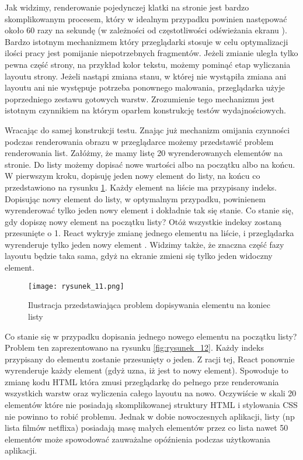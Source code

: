Jak widzimy, renderowanie pojedynczej klatki na stronie jest bardzo skomplikowanym procesem, który w idealnym przypadku powinien następować około 60 razy na sekundę (w zależności od  częstotliwości odświeżania ekranu ).
Bardzo istotnym mechanizmem który przeglądarki stosuje w celu optymalizacji ilości pracy jest pomijanie niepotrzebnych fragmentów.
Jeżeli zmianie uległa tylko pewna część strony, na przykład kolor tekstu, możemy pominąć etap wyliczania layoutu strony.
Jeżeli nastąpi zmiana stanu, w której nie wystąpiła zmiana ani layoutu ani nie występuje potrzeba ponownego malowania, przeglądarka użyje poprzedniego zestawu gotowych warstw.
Zrozumienie tego mechanizmu jest istotnym czynnikiem na którym oparłem konstrukcję testów wydajnościowych.

Wracając do samej konstrukcji testu. Znając już mechanizm omijania czynności podczas renderowania obrazu w przeglądarce możemy przedstawić problem renderowania list.
Załóżmy, że mamy listę 20 wyrenderowanych elementów na stronie. Do listy możemy dopisać nowe wartości albo na początku albo na końcu.
W pierwszym kroku, dopisuję jeden nowy element do listy, na końcu co przedstawiono na rysunku \ref{fig:rysunek_11}. Każdy element na liście ma przypisany indeks.
Dopisując nowy element do listy, w optymalnym przypadku, powinienem wyrenderować tylko jeden nowy element i dokładnie tak się stanie. Co stanie się, gdy dopiszę nowy element na początku listy? Otóż wszystkie indeksy zostaną przesunięte o 1.
React wykryje zmianę jednego elementu na liście, i przeglądarka wyrenderuje tylko jeden nowy element . Widzimy także, że znaczna część fazy layoutu będzie taka sama, gdyż na ekranie zmieni się tylko jeden widoczny element.

\begin{figure}[htbp]
    \centering
    \texttt{[image: rysunek\_11.png]}
    \caption{Ilustracja przedstawiająca problem dopisywania elementu na koniec listy}
    \label{fig:rysunek_11}
\end{figure}

Co stanie się w przypadku dopisania jednego nowego elementu na początku listy? Problem ten zaprezentowano na rysunku \ref{fig:rysunek_12}. Każdy indeks przypisany do elementu zostanie przesunięty o jeden.
Z racji tej, React ponownie wyrenderuje każdy element (gdyż uzna, iż jest to nowy element). Spowoduje to zmianę kodu HTML która zmusi przeglądarkę do pełnego prze renderowania wszystkich warstw oraz wyliczenia całego layoutu na nowo.
Oczywiście w skali 20 elementów które nie posiadają skomplikowanej struktury HTML i stylowania CSS nie powinno to robić problemu.
Jednak w dobie nowoczesnych aplikacji, listy (np lista filmów netflixa) posiadają masę małych elementów przez co lista nawet 50 elementów może spowodować zauważalne opóźnienia podczas użytkowania aplikacji.

